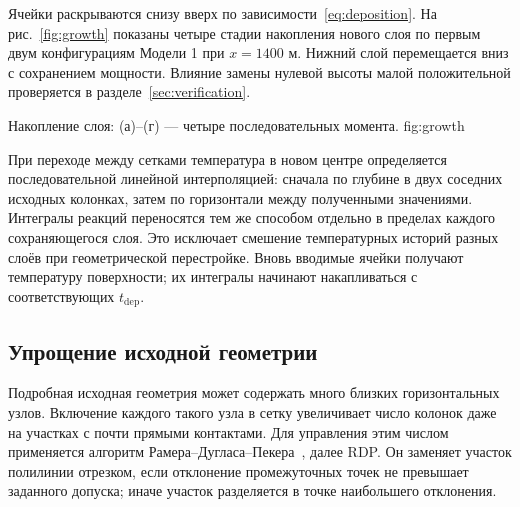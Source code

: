 Ячейки раскрываются снизу вверх по зависимости~\eqref{eq:deposition}.
На рис.~\ref{fig:growth} показаны четыре стадии накопления нового
слоя по первым двум конфигурациям Модели 1 при $x=1400$ м.
Нижний слой перемещается вниз с сохранением мощности.
Влияние замены нулевой высоты малой положительной проверяется
в разделе~\ref{sec:verification}.

  {Накопление слоя: (а)--(г) --- четыре последовательных момента.}
  {fig:growth}

При переходе между сетками температура в новом центре определяется
последовательной линейной интерполяцией: сначала по глубине в двух
соседних исходных колонках, затем по горизонтали между полученными
значениями. Интегралы реакций переносятся тем же способом отдельно
в пределах каждого сохраняющегося слоя. Это исключает смешение
температурных историй разных слоёв при геометрической перестройке.
Вновь вводимые ячейки получают температуру поверхности;
их интегралы начинают накапливаться с соответствующих $t_{\mathrm{dep}}$.

\subsection{Упрощение исходной геометрии}

Подробная исходная геометрия может содержать много близких
горизонтальных узлов. Включение каждого такого узла в сетку
увеличивает число колонок даже на участках с почти прямыми контактами.
Для управления этим числом применяется алгоритм
Рамера--Дугласа--Пекера~\cite{ramer1972,douglas1973}, далее RDP.
Он заменяет участок полилинии отрезком, если отклонение промежуточных
точек не превышает заданного допуска; иначе участок разделяется
в точке наибольшего отклонения.

